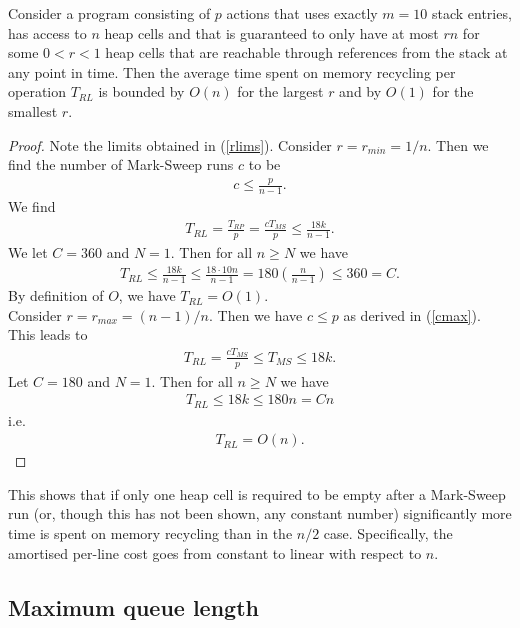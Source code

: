\documentclass{article}
\begin{document}
\begin{claim}
    Consider a program consisting of $p$ actions that uses exactly $m=10$
    stack entries, has access to $n$ heap cells and that is guaranteed to only
    have at most $rn$ for some $0<r<1$ heap cells that are reachable through references
    from the stack at any point in time.
    Then the average time spent on memory recycling per operation $T_{RL}$ is bounded by $O(n)$ for
    the largest $r$ and by $O(1)$ for the smallest $r$.
\end{claim}

\begin{proof}
    Note the limits obtained in (\ref{rlims}). Consider $r=r_{min}=1/n$. Then we find
    the number of Mark-Sweep runs $c$ to be
    \begin{align*}
      c \leq \frac{p}{n-1}.  
    \end{align*}
    We find
    \begin{align*}
        T_{RL} = \frac{T_{RP}}{p} = \frac{cT_{MS}}{p} \leq \frac{18k}{n-1}.
    \end{align*}
    We let $C=360$ and $N=1$. Then for all $n\geq N$ we have
    \begin{align*}
        T_{RL} \leq \frac{18k}{n-1} \leq \frac{18\cdot 10n}{n-1} = 180\left(\frac{n}{n-1}\right) \leq 360 = C.
    \end{align*}
    By definition of $O$, we have $T_{RL}=O(1)$.\\
    Consider $r=r_{max}=(n-1)/n$. Then we have $c\leq p$ as derived in (\ref{cmax}).
    This leads to
    \begin{align*}
        T_{RL}=\frac{cT_{MS}}{p}\leq T_{MS} \leq 18k.
    \end{align*}
    Let $C=180$ and $N=1$. Then for all $n\geq N$ we have
    \begin{align*}
        T_{RL} \leq 18k \leq 180n = Cn
    \end{align*}
    i.e.
    \begin{align*}
        T_{RL} = O(n).
    \end{align*}
\end{proof}
This shows that if only one heap cell is required to be empty after a Mark-Sweep run
(or, though this has not been shown, any constant number) significantly more time is
spent on memory recycling than in the $n/2$ case. Specifically, the amortised per-line
cost goes from constant to linear with respect to $n$.

\subsection{Maximum queue length}
\end{document}
